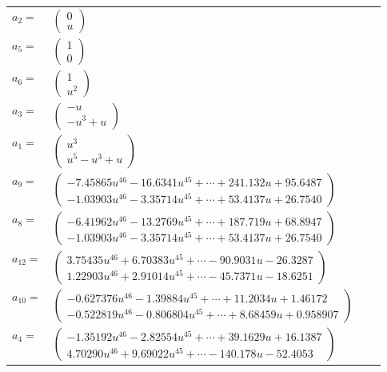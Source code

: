 \documentclass[1p]{elsarticle_modified}
\theoremstyle{definition}
\begin{document}
\begin{tabular}{m{7pt} m{180pt} m{7pt} m{180pt} }
\flushright $a_{2}=$&$\begin{pmatrix}0\\u\end{pmatrix}$ \\
\flushright $a_{5}=$&$\begin{pmatrix}1\\0\end{pmatrix}$ \\
\flushright $a_{6}=$&$\begin{pmatrix}1\\u^2\end{pmatrix}$ \\
\flushright $a_{3}=$&$\begin{pmatrix}- u\\- u^3+u\end{pmatrix}$ \\
\flushright $a_{1}=$&$\begin{pmatrix}u^3\\u^5- u^3+u\end{pmatrix}$ \\
\flushright $a_{9}=$&$\begin{pmatrix}-7.45865 u^{46}-16.6341 u^{45}+\cdots+241.132 u+95.6487\\-1.03903 u^{46}-3.35714 u^{45}+\cdots+53.4137 u+26.7540\end{pmatrix}$ \\
\flushright $a_{8}=$&$\begin{pmatrix}-6.41962 u^{46}-13.2769 u^{45}+\cdots+187.719 u+68.8947\\-1.03903 u^{46}-3.35714 u^{45}+\cdots+53.4137 u+26.7540\end{pmatrix}$ \\
\flushright $a_{12}=$&$\begin{pmatrix}3.75435 u^{46}+6.70383 u^{45}+\cdots-90.9031 u-26.3287\\1.22903 u^{46}+2.91014 u^{45}+\cdots-45.7371 u-18.6251\end{pmatrix}$ \\
\flushright $a_{10}=$&$\begin{pmatrix}-0.627376 u^{46}-1.39884 u^{45}+\cdots+11.2034 u+1.46172\\-0.522819 u^{46}-0.806804 u^{45}+\cdots+8.68459 u+0.958907\end{pmatrix}$ \\
\flushright $a_{4}=$&$\begin{pmatrix}-1.35192 u^{46}-2.82554 u^{45}+\cdots+39.1629 u+16.1387\\4.70290 u^{46}+9.69022 u^{45}+\cdots-140.178 u-52.4053\end{pmatrix}$ \\

\end{tabular}
\end{document}
